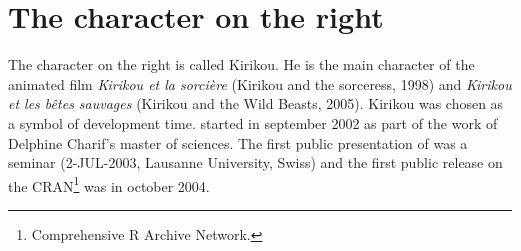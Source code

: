 \documentclass[a4paper]{article}
\begin{document}
\section{The character on the right}

The character on the right is called Kirikou. He is the main character of the animated film \textit{Kirikou et la sorci{\`e}re}
(Kirikou and the sorceress, 1998) and \textit{Kirikou et les b{\^e}tes sauvages}
(Kirikou and the Wild Beasts, 2005). Kirikou was chosen as a symbol of \seqinr{}
development time. \Seqinr{} started in september 2002 as part of the work of
Delphine Charif's master of sciences. The first public presentation of \seqinr{}
was a seminar (2-JUL-2003, Lausanne University, Swiss) and the first public
release on the CRAN\footnote{
Comprehensive R Archive Network.
} was in october 2004.
\end{document}
